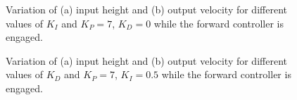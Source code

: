 \begin{figure}
  \centering
  \caption{Variation of (a) input height and (b) output velocity for different values of $K_{I}$ and $K_P=7$, $K_D=0$ while the forward controller is engaged.}\label{fig:tune-fwd-int}
\end{figure}
\begin{figure}
  \centering
  \caption{Variation of (a) input height and (b) output velocity for different values of $K_{D}$ and $K_P=7$, $K_I=0.5$ while the forward controller is engaged.}\label{fig:tune-fwd-der}
\end{figure}


